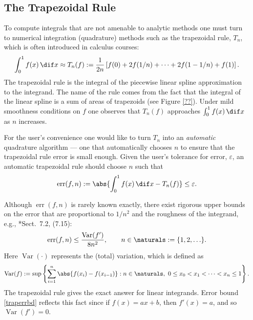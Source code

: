 \documentclass[]{amsart}
\DeclareMathOperator{\Var}{Var}
\DeclareMathOperator{\err}{err}
\theoremstyle{definition}
\theoremstyle{remark}
\begin{document}
\subsection{The Trapezoidal Rule}
To compute integrals that are not amenable to analytic methods one must turn to numerical integration (quadrature) methods such as the trapezoidal rule, $T_n$, which is often introduced in calculus courses:
\begin{equation}
\int_0^1 f(x) \, \dif x \approx T_n(f) := \frac{1}{2n} \left [ f(0) + 2 f(1/n) + \cdots + 2 f(1-1/n) + f(1) \right].
\end{equation}
The trapezoidal rule is the integral of the piecewise linear spline approximation to the integrand.  The name of the rule comes from the fact that the integral of the linear spline is a sum of areas of trapezoids (see Figure \ref{??}). Under mild smoothness conditions on $f$ one observes that $T_n(f)$ approaches $\int_0^1 f(x) \, \dif x$ as $n$ increases. 

For the user's convenience one would like to turn $T_n$ into an \emph{automatic} quadrature algorithm --- one that automatically chooses $n$ to ensure that the trapezoidal rule error is small enough.  Given the user's tolerance for error, $\varepsilon$, an automatic trapezoidal rule should choose $n$ such that 
\begin{equation} \label{errdef}
\err(f,n) := \abs{\int_0^1 f(x) \, \dif x - T_n(f)} \le \varepsilon.
\end{equation}

Although $\err(f,n)$ is rarely known exactly, there exist rigorous upper bounds on the error that are proportional to $1/n^2$ and the roughness of the integrand, e.g., *{Sect.\ 7.2, (7.15)}: 
\begin{equation} \label{traperrbd}
\err(f,n) \le \frac{\Var(f')}{8n^2}, \qquad n \in \naturals := \{1, 2, \ldots \}. 
\end{equation}
Here $\Var(\cdot)$ represents the (total) variation, which is defined as
\begin{equation} \label{vardef}
\Var(f) := \sup \left \{ \sum_{i=1}^n \abs{f(x_i)-f(x_{i-1})} : n \in \naturals, \ 0 \le x_0 < x_1 < \cdots < x_{n} \le 1 \right\}.
\end{equation}
The trapezoidal rule gives the exact answer for linear integrands.  Error bound \eqref{traperrbd} reflects this fact since if $f(x)=ax+b$, then $f'(x)=a$, and so $\Var(f')=0$.
\end{document}
